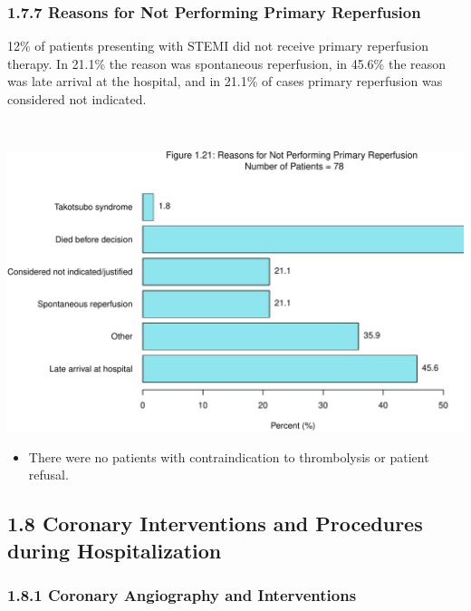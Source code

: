 \documentclass[
]{article}
\providecommand{\tightlist}{%
  \setlength{\itemsep}{0pt}\setlength{\parskip}{0pt}}
\begin{document}
\pagebreak

\subsubsection{1.7.7 Reasons for Not Performing Primary
Reperfusion}\label{reasons-for-not-performing-primary-reperfusion}

12\% of patients presenting with STEMI did not receive primary
reperfusion therapy. In 21.1\% the reason was spontaneous reperfusion,
in 45.6\% the reason was late arrival at the hospital, and in 21.1\% of
cases primary reperfusion was considered not indicated.

~

\includegraphics{ACSIS_2024_v1_pdf_files/figure-latex/unnamed-chunk-73-1.pdf}

\begin{itemize}
\tightlist
\item
  There were no patients with contraindication to thrombolysis or
  patient refusal.
\end{itemize}

\pagebreak

\subsection{1.8 Coronary Interventions and Procedures during
Hospitalization}\label{coronary-interventions-and-procedures-during-hospitalization}

\subsubsection{1.8.1 Coronary Angiography and
Interventions}\label{coronary-angiography-and-interventions}
\end{document}
